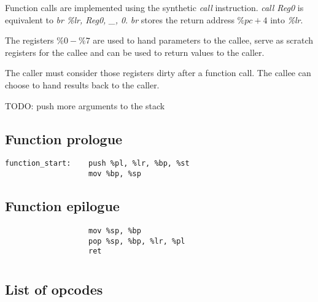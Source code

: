 \documentclass{article}
\begin{document}
\newcommand{\I}[1]{\emph{#1}}

Function calls are implemented using the synthetic \I{call}
instruction. \I{call Reg0} is equivalent to \I{br \%lr, Reg0, \_,
  0}. \I{br} stores the return address \(\%pc + 4\) into \I{\%lr}.

The registers \(\%0 - \%7\) are used to hand parameters to the callee,
serve as scratch registers for the callee and can be used to return
values to the caller.

The caller must consider those registers dirty after a function call.
The callee can choose to hand results back to the caller.

TODO: push more arguments to the stack

\subsection{Function prologue}

\begin{lstlisting}
function_start:    push %pl, %lr, %bp, %st
                   mov %bp, %sp
\end{lstlisting}

\subsection{Function epilogue}

\begin{lstlisting}
                   mov %sp, %bp
                   pop %sp, %bp, %lr, %pl
                   ret
\end{lstlisting}

\appendix
\section{\appendixname}

\subsection{List of opcodes}

\end{document}
